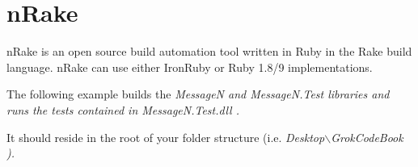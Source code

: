 
\chapter{nRake}\label{nrake}
nRake is an open source build automation tool written in Ruby in the Rake build language. nRake can use either IronRuby or Ruby 1.8/9 implementations.

The following example builds the \em MessageN \em and \em MessageN.Test \em libraries and runs the tests contained in \em MessageN.Test.dll \em.



It should reside in the root of your folder structure (i.e. \em Desktop$\backslash$GrokCodeBook \em).